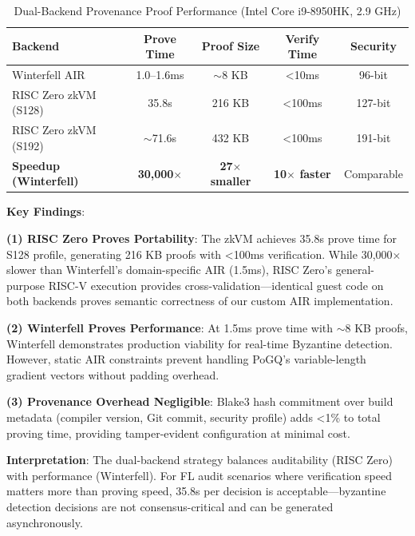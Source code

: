\begin{table}[h]
\centering
\caption{Dual-Backend Provenance Proof Performance (Intel Core i9-8950HK, 2.9 GHz)}
\label{tab:vsv_stark_dual_backend}
\begin{tabular}{lcccc}
\toprule
\textbf{Backend} & \textbf{Prove Time} & \textbf{Proof Size} & \textbf{Verify Time} & \textbf{Security} \\
\midrule
Winterfell AIR & 1.0--1.6ms & $\sim$8 KB & <10ms & 96-bit \\
RISC Zero zkVM (S128) & 35.8s & 216 KB & <100ms & 127-bit \\
RISC Zero zkVM (S192) & $\sim$71.6s\footnotemark & 432 KB\footnotemark[\value{footnote}] & <100ms & 191-bit \\
\midrule
\textbf{Speedup (Winterfell)} & \textbf{30,000$\times$} & \textbf{27$\times$ smaller} & \textbf{10$\times$ faster} & Comparable \\
\bottomrule
\end{tabular}
\end{table}

\textbf{Key Findings}:

\textbf{(1) RISC Zero Proves Portability}: The zkVM achieves 35.8s prove time for S128 profile, generating 216 KB proofs with <100ms verification. While 30,000$\times$ slower than Winterfell's domain-specific AIR (1.5ms), RISC Zero's general-purpose RISC-V execution provides cross-validation---identical guest code on both backends proves semantic correctness of our custom AIR implementation.

\textbf{(2) Winterfell Proves Performance}: At 1.5ms prove time with $\sim$8 KB proofs, Winterfell demonstrates production viability for real-time Byzantine detection. However, static AIR constraints prevent handling PoGQ's variable-length gradient vectors without padding overhead.

\textbf{(3) Provenance Overhead Negligible}: Blake3 hash commitment over build metadata (compiler version, Git commit, security profile) adds <1\% to total proving time, providing tamper-evident configuration at minimal cost.

\textbf{Interpretation}: The dual-backend strategy balances auditability (RISC Zero) with performance (Winterfell). For FL audit scenarios where verification speed matters more than proving speed, 35.8s per decision is acceptable---byzantine detection decisions are not consensus-critical and can be generated asynchronously.

